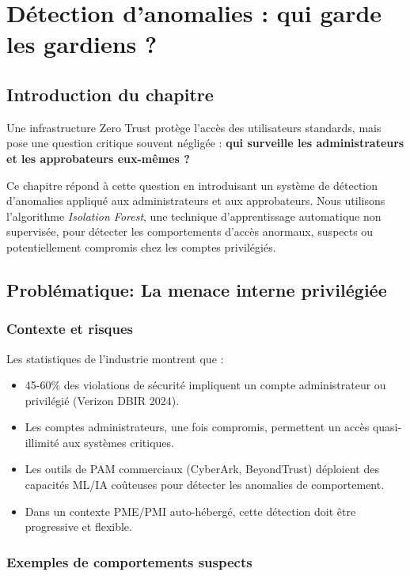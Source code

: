 \chapter{Détection d'anomalies : qui garde les gardiens ?}

\section{Introduction du chapitre}

Une infrastructure Zero Trust protège l'accès des utilisateurs standards, mais pose une question critique souvent négligée : \textbf{qui surveille les administrateurs et les approbateurs eux-mêmes ?}

Ce chapitre répond à cette question en introduisant un système de détection d'anomalies appliqué aux administrateurs et aux approbateurs. Nous utilisons l'algorithme \textit{Isolation Forest}, une technique d'apprentissage automatique non supervisée, pour détecter les comportements d'accès anormaux, suspects ou potentiellement compromis chez les comptes privilégiés.

\section{Problématique: La menace interne privilégiée}

\subsection{Contexte et risques}

Les statistiques de l'industrie montrent que :
\begin{itemize}
	\item 45-60\% des violations de sécurité impliquent un compte administrateur ou privilégié (Verizon DBIR 2024).
	\item Les comptes administrateurs, une fois compromis, permettent un accès quasi-illimité aux systèmes critiques.
	\item Les outils de PAM commerciaux (CyberArk, BeyondTrust) déploient des capacités ML/IA coûteuses pour détecter les anomalies de comportement.
	\item Dans un contexte PME/PMI auto-hébergé, cette détection doit être progressive et flexible.
\end{itemize}

\subsection{Exemples de comportements suspects}

